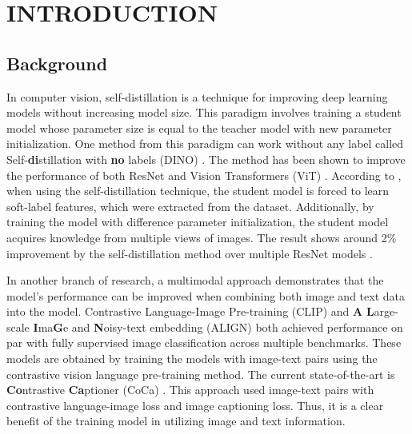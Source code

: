 \setlength{\parindent}{0in}
\setlength{\parskip}{1.5mm}
\setlength{\baselineskip}{1.6em}

\chapter{INTRODUCTION}
\section{Background}

In computer vision, self-distillation  is a technique for improving deep learning models without increasing model size.
This paradigm involves training a student model whose parameter size is equal to the teacher model with new parameter initialization.
One method from this paradigm can work without any label called Self-\textbf{di}stillation with \textbf{no} labels (DINO) .
The method has been shown to improve the performance of both ResNet  and Vision Transformers (ViT) .
According to , when using the self-distillation technique, the student model is forced to learn soft-label features, which were extracted from the dataset. Additionally, by training the model with difference parameter initialization, the student model acquires knowledge from multiple views of images. The result shows around 2\% improvement by the self-distillation method over multiple ResNet models .

In another branch of research, a multimodal approach demonstrates that the model's performance can be improved when combining both image and text data into the model.
Contrastive Language-Image Pre-training (CLIP)  and \textbf{A} \textbf{L}arge-scale \textbf{I}ma\textbf{G}e and \textbf{N}oisy-text embedding (ALIGN)  both achieved performance on par with fully supervised image classification across multiple benchmarks.
These models are obtained by training the models with image-text pairs using the contrastive vision language pre-training method.
The current state-of-the-art is \textbf{Co}ntrastive \textbf{Ca}ptioner (CoCa) .
This approach used image-text pairs with contrastive language-image loss and image captioning loss.
Thus, it is a clear benefit of the training model in utilizing image and text information.

